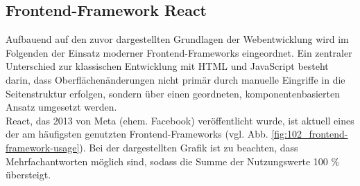 \subsection{Frontend-Framework React}
\label{sec:react}

Aufbauend auf den zuvor dargestellten Grundlagen der Webentwicklung wird im Folgenden der Einsatz moderner Frontend-Frameworks eingeordnet.
Ein zentraler Unterschied zur klassischen Entwicklung mit HTML und JavaScript besteht darin, dass Oberflächenänderungen 
nicht primär durch manuelle Eingriffe in die Seitenstruktur erfolgen, sondern über einen geordneten, komponentenbasierten Ansatz umgesetzt werden. \\

React, das 2013 von Meta (ehem. Facebook) veröffentlicht wurde, ist aktuell eines der am häufigsten genutzten Frontend-Frameworks (vgl. Abb. \ref{fig:102_frontend-framework-usage}).
Bei der dargestellten Grafik ist zu beachten, dass Mehrfachantworten möglich sind, sodass die Summe der Nutzungswerte 100 \% übersteigt. \\

